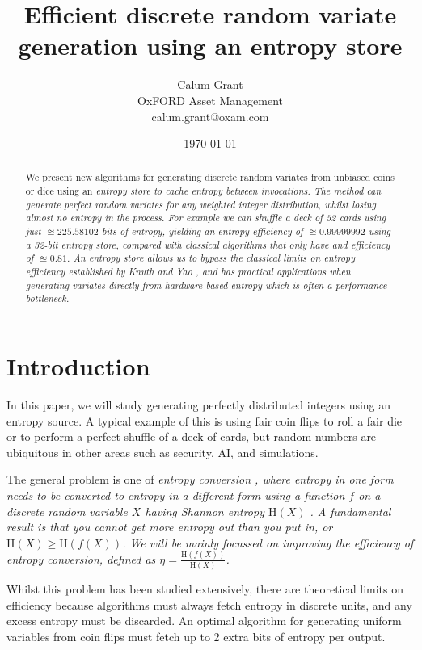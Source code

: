 \documentclass[12pt]{article}
\title{Efficient discrete random variate generation using an entropy store}
\author{Calum Grant \\
OxFORD Asset Management \\
calum.grant@oxam.com}
\date{\today}
\newcommand{\entropy}[1]{\mathrm{H}(#1)}
\begin{document}
\maketitle

\begin{abstract}
    We present new algorithms for generating discrete random variates from unbiased coins or dice using an \em entropy store \em to cache entropy between invocations. The method can generate perfect random variates for any weighted integer distribution, whilst losing almost no entropy in the process.  For example we can shuffle a deck of 52 cards using just $\approxeq 225.58102$ bits of entropy, yielding an entropy  efficiency of $\approxeq 0.99999992$ using a 32-bit entropy store, compared with classical algorithms that only have and efficiency of $\approxeq 0.81$. An entropy store allows us to bypass the classical limits on entropy efficiency established by Knuth and Yao \cite{Knuth1976TheCO}, and has practical applications when generating variates directly from hardware-based entropy which is often a performance bottleneck.    
\end{abstract}

\section{Introduction}

In this paper, we will study generating perfectly distributed integers using an entropy source. A typical example of this is using fair coin flips to roll a fair die or to perform a perfect shuffle of a deck of cards, but random numbers are ubiquitous in other areas such as security, AI, and simulations.

The general problem is one of \em entropy conversion \em, where entropy in one form needs to be converted to entropy in a different form using a function $f$ on a discrete random variable $X$ having Shannon entropy $\entropy{X}$
\cite{shannon1948mathematical}.  
A fundamental result is that you cannot get more entropy out than you put in, or $\entropy{X} \ge \entropy{f(X)}$. \cite{cover1999elements} 
We will be mainly focussed on improving the \em efficiency \em of entropy conversion, defined as $\eta = \frac{\entropy{f(X)}}{\entropy{X}}$.

Whilst this problem has been studied extensively, there are theoretical limits on efficiency because algorithms must always fetch entropy in discrete units, and any excess entropy must be discarded. An optimal algorithm for generating uniform variables from coin flips must fetch up to 2 extra bits of entropy per output.  \cite{cover1999elements, Knuth1976TheCO}
\end{document}
